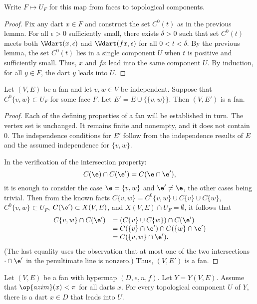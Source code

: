 Write $F\mapsto U_F$ for this map from faces to topological components.
%

\begin{proof}  Fix any dart $x\in F$ and construct the set $C^0(t)$ as
in the previous lemma.  
For all $\epsilon>0$
sufficiently small, there exists $\delta>0$ such that set $C^0(t)$ meets
both $\Wdart(x,\epsilon)$ and $\Wdart(f x,\epsilon)$ for all $0<t<\delta$.  
By the previous lemma, the set $C^0(t)$ lies in a single
component $U$ when $t$ is positive and sufficiently small.  
Thus,
$x$ and $f x$ lead into the same component $U$.  By induction, for all
$y\in F$, the dart $y$ leads into $U$.
\end{proof}

\begin{lemma}\label{lemma:add-edge}
Let $(V,E)$ be a fan and let $v,w\in V$ be independent.   Suppose that
$C^0\{v,w\}\subset U_F$ for some face $F$.  Let $E' = E\cup\{\{v,w\}\}$.  Then
$(V,E')$ is a fan.
\end{lemma}

\begin{proof} Each of the defining properties of a fan will be established in turn.
The vertex set is unchanged.  It remains finite and nonempty, and it does not contain $0$.  The independence conditions for $E'$ follow from the independence results of $E$
and the assumed independence for $\{v,w\}$.  

In the verification of the intersection property:
$$
C(\e)\cap C(\e') = C(\e \cap \e'),
$$
it is enough to consider the case $\e = \{v,w\}$ and $\e' \ne \e$, the other cases being trivial.  Then from the known facts $C\{v,w\} = C^0\{v,w\}\cup C\{v\}\cup C\{w\}$, $C^0\{v,w\}\subset U_F$,   $C(\e')\subset X(V,E)$, and $X(V,E)\cap U_F=\emptyset$, it follows that
$$
\begin{array}{rll}
C\{v,w\} \cap C(\e')  &= (C\{v\} \cup C\{w\}) \cap C(\e') \\
  &= C(\{v\}\cap \e') \cap C(\{w\}\cap \e')\\
  &= C(\{v,w\}\cap \e').
\end{array}
$$
(The last equality uses the observation that at most one of the two intersections $\cdot\cap\e'$ in the penultimate line is nonzero.)
Thus, $(V,E')$ is a fan.
\end{proof}


\begin{lemma}\label{lemma:lead-exists}
Let $(V,E)$ be a fan with hypermap $(D,e,n,f)$. Let $Y=Y(V,E)$. Assume that $\op{azim}(x)<\pi$ for all darts $x$.  For every topological component $U$ of $Y$, there is a dart $x\in D$ that leads into $U$.
\end{lemma}
%
%
%

